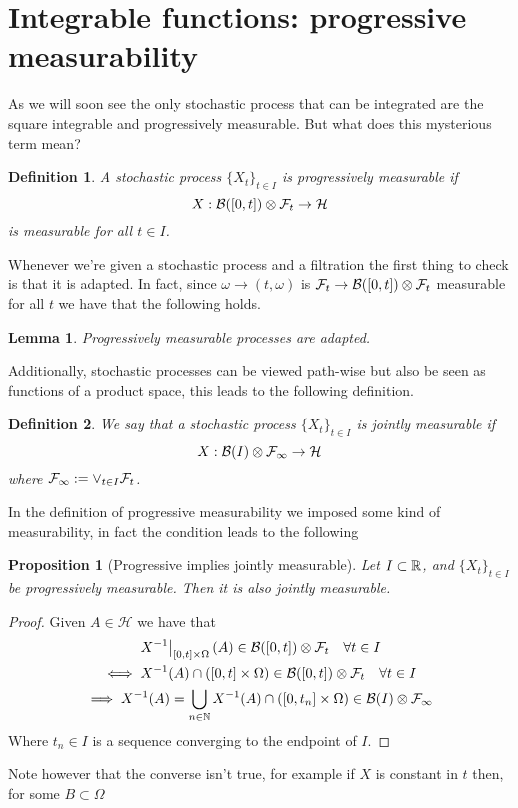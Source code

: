 \documentclass[12pt]{article}
\newtheorem{proposition}{Proposition}
\newtheorem{lemma}{Lemma}
\newtheorem{definition}{Definition}
\begin{document}
\section{Integrable functions: progressive measurability}
As we will soon see the only stochastic process that can be integrated are the square integrable and progressively measurable. But what does this mysterious term mean?
\begin{definition}
	A stochastic process $\{X_t\}_{t\in I}$  is \emph{progressively measurable} if $$X:\mathcal{B}([0,t])\otimes\mathcal{F}_t\to \mathcal{H}$$ is measurable for all $t\in I$.
\end{definition}
Whenever we're given a stochastic process and a filtration the first thing to check is that it is adapted. In fact, since $\omega\to(t,\omega)$ is $\mathcal{F}_t\to \mathcal{B}([0,t])\otimes \mathcal{F}_t$ measurable for all $t$ we have that the following holds.
\begin{lemma}
	Progressively measurable processes are adapted.
\end{lemma}
Additionally, stochastic processes can be viewed path-wise but also be seen as functions of a product space, this leads to the following definition.
\begin{definition}
	We say that a stochastic process $\{X_t\}_{t\in I}$ is jointly measurable if $$X:\mathcal{B}(I)\otimes\mathcal{F}_\infty\to \mathcal{H}$$
	where $\mathcal{F}_\infty:=\vee_{t\in I}\mathcal{F}_t$.
\end{definition}
In the definition of progressive measurability we imposed some kind of measurability, in fact the condition leads to the following
\begin{proposition}[Progressive implies jointly measurable]
	Let $I\subset{\mathbb R}$, and $\{X_t\}_{t\in I}$ be progressively measurable. Then it is also jointly measurable.
\end{proposition}
\begin{proof}
	Given $A\in\mathcal{H}$ we have that
	\begin{multline*}
		\left.{X^{-1}}\right|_{[0,t]\times\Omega}(A)\in\mathcal{B}([0,t])\otimes\mathcal{F}_t\quad\forall t\in I\\ \iff X^{-1}(A)\cap([0,t]\times\Omega)\in\mathcal{B}([0,t])\otimes\mathcal{F}_t\quad\forall t\in I\\\implies X^{-1}(A)=\bigcup_{n \in  \mathbb{N}}X^{-1}(A)\cap([0,t_n]\times\Omega) \in\mathcal{B}(I)\otimes\mathcal{F}_\infty
	\end{multline*}
	Where $t_n\in I$ is a sequence converging to the endpoint of $I$.
\end{proof}
Note however that the converse isn't true, for example if $X$ is constant in $t$ then, for some $B\subset \Omega$
\end{document}
